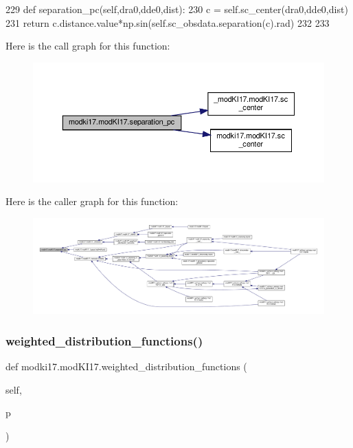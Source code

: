 \begin{DoxyCode}
229     \textcolor{keyword}{def }separation\_pc(self,dra0,dde0,dist):
230         c = self.sc\_center(dra0,dde0,dist)
231         \textcolor{keywordflow}{return} c.distance.value*np.sin(self.sc\_obsdata.separation(c).rad)
232     
233     
\end{DoxyCode}
Here is the call graph for this function\+:\nopagebreak
\begin{figure}[H]
\begin{center}
\leavevmode
\includegraphics[width=350pt]{df/da3/classmodki17_1_1modKI17_aa68e948ebfbe3aeef6d9defb249317c4_cgraph}
\end{center}
\end{figure}
Here is the caller graph for this function\+:\nopagebreak
\begin{figure}[H]
\begin{center}
\leavevmode
\includegraphics[width=350pt]{df/da3/classmodki17_1_1modKI17_aa68e948ebfbe3aeef6d9defb249317c4_icgraph}
\end{center}
\end{figure}
\mbox{\label{classmodki17_1_1modKI17_abab55a25d43afbd5737246fd8da155f7}} 
\subsubsection{\texorpdfstring{weighted\+\_\+distribution\+\_\+functions()}{weighted\_distribution\_functions()}}
{\footnotesize\ttfamily def modki17.\+mod\+K\+I17.\+weighted\+\_\+distribution\+\_\+functions (\begin{DoxyParamCaption}\item[{}]{self,  }\item[{}]{p }\end{DoxyParamCaption})}

